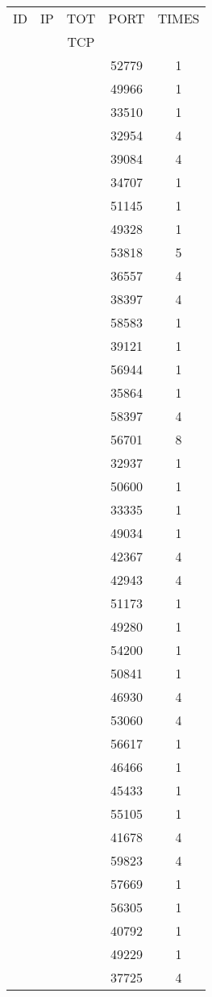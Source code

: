 \documentclass[a4paper]{scrartcl}
\begin{document}
\begin{minipage}[b]{0.5\linewidth}
\begin{tabular}{| c | c | c | c | c |}
\hline
ID & IP & TOT & PORT & TIMES \\ 
   &    & TCP &      &       \\ 
\hline
& & & 52779 & 1 \\ & & & 49966 & 1 \\ & & & 33510 & 1 \\ & & & 32954 & 4 \\ & & & 39084 & 4 \\ & & & 34707 & 1 \\ & & & 51145 & 1 \\ & & & 49328 & 1 \\ & & & 53818 & 5 \\ & & & 36557 & 4 \\ & & & 38397 & 4 \\ & & & 58583 & 1 \\ & & & 39121 & 1 \\ & & & 56944 & 1 \\ & & & 35864 & 1 \\ & & & 58397 & 4 \\ & & & 56701 & 8 \\ & & & 32937 & 1 \\ & & & 50600 & 1 \\ & & & 33335 & 1 \\ & & & 49034 & 1 \\ & & & 42367 & 4 \\ & & & 42943 & 4 \\ & & & 51173 & 1 \\ & & & 49280 & 1 \\ & & & 54200 & 1 \\ & & & 50841 & 1 \\ & & & 46930 & 4 \\ & & & 53060 & 4 \\ & & & 56617 & 1 \\ & & & 46466 & 1 \\ & & & 45433 & 1 \\ & & & 55105 & 1 \\ & & & 41678 & 4 \\ & & & 59823 & 4 \\ & & & 57669 & 1 \\ & & & 56305 & 1 \\ & & & 40792 & 1 \\ & & & 49229 & 1 \\ & & & 37725 & 4 \\ \hline\end{tabular}\end{minipage} \hfill\begin{minipage}[b]{0.5\linewidth}\begin{tabular}{| c | c | c | c | c |}

\end{tabular}
\end{minipage}
\end{document}
